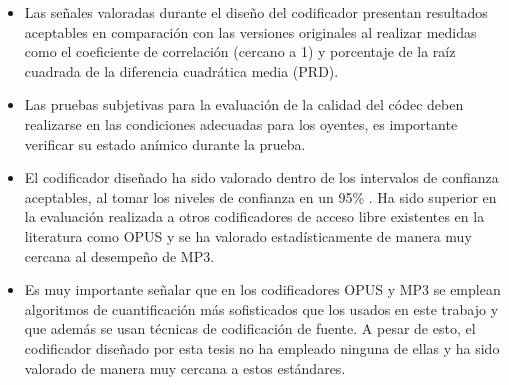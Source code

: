 \begin{itemize}
	\item Las señales valoradas durante el diseño del codificador presentan resultados aceptables en comparación con las versiones 				originales al realizar medidas como el coeficiente de correlación (cercano a 1) y porcentaje de la raíz cuadrada de la diferencia cuadrática media 			(PRD).
	\item Las pruebas subjetivas para la evaluación de la calidad del códec deben realizarse en las condiciones adecuadas para los oyentes, es 		importante verificar su estado anímico durante la prueba.
	\item El codificador diseñado ha sido valorado dentro de los intervalos de confianza aceptables, al tomar los niveles de confianza en un 			95\% . Ha sido superior en la evaluación realizada a otros codificadores de acceso libre existentes en la literatura como OPUS y se ha valorado estadísticamente de manera muy cercana al desempeño de MP3. 
	\item Es muy importante señalar que en los codificadores OPUS y MP3 se emplean algoritmos de cuantificación más sofisticados que los usados en este trabajo y que además se usan técnicas de codificación de fuente. A pesar de esto, el codificador diseñado por esta tesis no ha empleado ninguna de ellas y ha sido valorado de manera muy cercana a estos estándares.	
\end{itemize}


